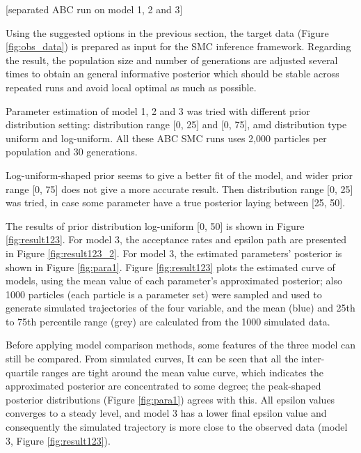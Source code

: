 \documentclass[12pt,a4paper]{report}
\begin{document}
[separated ABC run on model 1, 2 and 3]

Using the suggested options in the previous section, the target data (Figure \ref{fig:obs_data}) is prepared as input for the SMC inference framework. Regarding the result, the population size and number of generations are adjusted several times to obtain an general informative posterior which should be stable across repeated runs and avoid local optimal as much as possible.

Parameter estimation of model 1, 2 and 3 was tried with different prior distribution setting: distribution range [0, 25] and [0, 75], amd distribution type uniform and log-uniform. All these ABC SMC runs uses 2,000 particles per population and 30 generations.

Log-uniform-shaped prior seems to give a better fit of the model, and wider prior range [0, 75] does not give a more accurate result. Then distribution range [0, 25] was tried, in case some parameter have a true posterior laying between [25, 50].

The results of prior distribution log-uniform [0, 50] is shown in Figure \ref{fig:result123}. For model 3, the acceptance rates and epsilon path are presented in Figure \ref{fig:result123_2}. For model 3, the estimated parameters' posterior is shown in Figure \ref{fig:para1}. Figure \ref{fig:result123} plots the estimated curve of models, using the mean value of each parameter's approximated posterior; also 1000 particles (each particle is a parameter set) were sampled and used to generate simulated trajectories of the four variable, and the mean (blue) and 25th to 75th percentile range (grey) are calculated from the 1000 simulated data.

Before applying model comparison methods, some features of the three model can still be compared. From simulated curves, It can be seen that all the inter-quartile ranges are tight around the mean value curve, which indicates the approximated posterior are concentrated to some degree; the peak-shaped posterior distributions (Figure \ref{fig:para1}) agrees with this. All epsilon values converges to a steady level, and model 3 has a lower final epsilon value and consequently the simulated trajectory is more close to the observed data (model 3, Figure \ref{fig:result123}).
\end{document}
